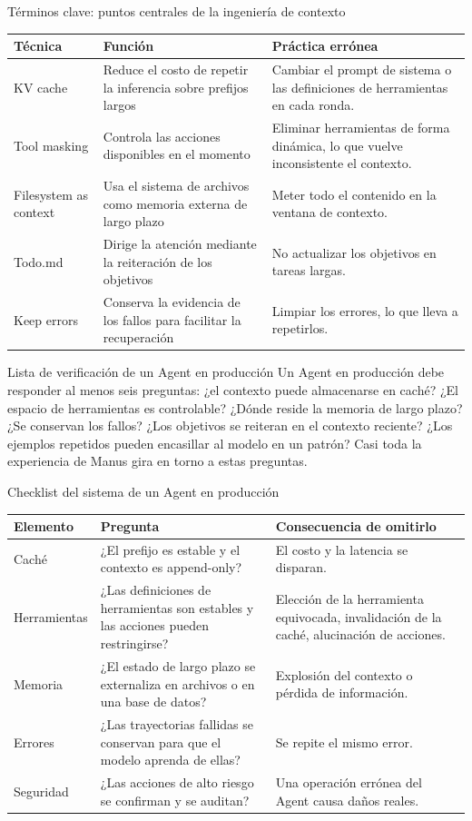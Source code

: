 \begin{knowledgebox}{Términos clave: puntos centrales de la ingeniería de contexto}
\begin{tabularx}{\textwidth}{p{}p{}X}
\toprule
Técnica & Función & Práctica errónea \\
\midrule
KV cache & Reduce el costo de repetir la inferencia sobre prefijos largos & Cambiar el prompt de sistema o las definiciones de herramientas en cada ronda. \\
Tool masking & Controla las acciones disponibles en el momento & Eliminar herramientas de forma dinámica, lo que vuelve inconsistente el contexto. \\
Filesystem as context & Usa el sistema de archivos como memoria externa de largo plazo & Meter todo el contenido en la ventana de contexto. \\
Todo.md & Dirige la atención mediante la reiteración de los objetivos & No actualizar los objetivos en tareas largas. \\
Keep errors & Conserva la evidencia de los fallos para facilitar la recuperación & Limpiar los errores, lo que lleva a repetirlos. \\
\bottomrule
\end{tabularx}
\end{knowledgebox}

\begin{importantbox}{Lista de verificación de un Agent en producción}
Un Agent en producción debe responder al menos seis preguntas: ¿el contexto puede almacenarse en caché? ¿El espacio de herramientas es controlable? ¿Dónde reside la memoria de largo plazo? ¿Se conservan los fallos? ¿Los objetivos se reiteran en el contexto reciente? ¿Los ejemplos repetidos pueden encasillar al modelo en un patrón? Casi toda la experiencia de Manus gira en torno a estas preguntas.
\end{importantbox}

\begin{knowledgebox}{Checklist del sistema de un Agent en producción}
\begin{tabularx}{\textwidth}{p{}p{}X}
\toprule
Elemento & Pregunta & Consecuencia de omitirlo \\
\midrule
Caché & ¿El prefijo es estable y el contexto es append-only? & El costo y la latencia se disparan. \\
Herramientas & ¿Las definiciones de herramientas son estables y las acciones pueden restringirse? & Elección de la herramienta equivocada, invalidación de la caché, alucinación de acciones. \\
Memoria & ¿El estado de largo plazo se externaliza en archivos o en una base de datos? & Explosión del contexto o pérdida de información. \\
Errores & ¿Las trayectorias fallidas se conservan para que el modelo aprenda de ellas? & Se repite el mismo error. \\
Seguridad & ¿Las acciones de alto riesgo se confirman y se auditan? & Una operación errónea del Agent causa daños reales. \\
\bottomrule
\end{tabularx}
\end{knowledgebox}

